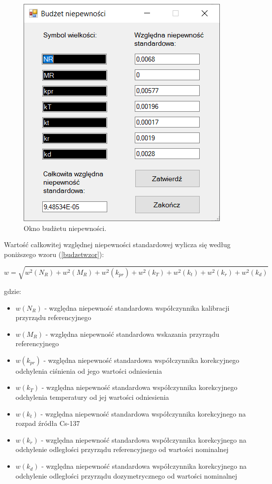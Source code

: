 \begin{figure}[htb]
	\centering
	\includegraphics{obrazki/Ustawienia/budzet_niepewnosci.png}
	\caption{Okno budżetu niepewności.}
	\label{budzetNiepewnosci}
\end{figure}

Wartość całkowitej względnej niepewności standardowej wylicza się według poniższego wzoru (\ref{budzetwzor}):

\begin{equation}
	\label{budzetwzor}
	w = \sqrt{{w^2(N_{R})}+{w^2(M_{R})}+{w^2(k_{pr})}+{w^2(k_{T})}+{w^2(k_{t})}+{w^2(k_{r})}+{w^2(k_{d})}}
\end{equation}

gdzie:
\begin{itemize}
	\item \textbf{$w(N_{R})$} - względna niepewność standardowa współczynnika kalibracji przyrządu referencyjnego
	\item \textbf{$w(M_{R})$} - względna niepewność standardowa wskazania przyrządu referencyjnego
	\item \textbf{$w(k_{pr})$} - względna niepewność standardowa współczynnika korekcyjnego odchylenia ciśnienia od jego wartości odniesienia
	\item \textbf{$w(k_{T})$} - względna niepewność standardowa współczynnika korekcyjnego odchylenia temperatury od jej wartości odniesienia
	\item \textbf{$w(k_{t})$} - względna niepewność standardowa współczynnika korekcyjnego na rozpad źródła Cs-137
	\item \textbf{$w(k_{r})$} - względna niepewność standardowa współczynnika korekcyjnego na odchylenie odległości przyrządu referencyjnego od wartości nominalnej
	\item \textbf{$w(k_{d})$} - względna niepewność standardowa współczynnika korekcyjnego na odchylenie odległości przyrządu dozymetrycznego od wartości nominalnej
\end{itemize}



